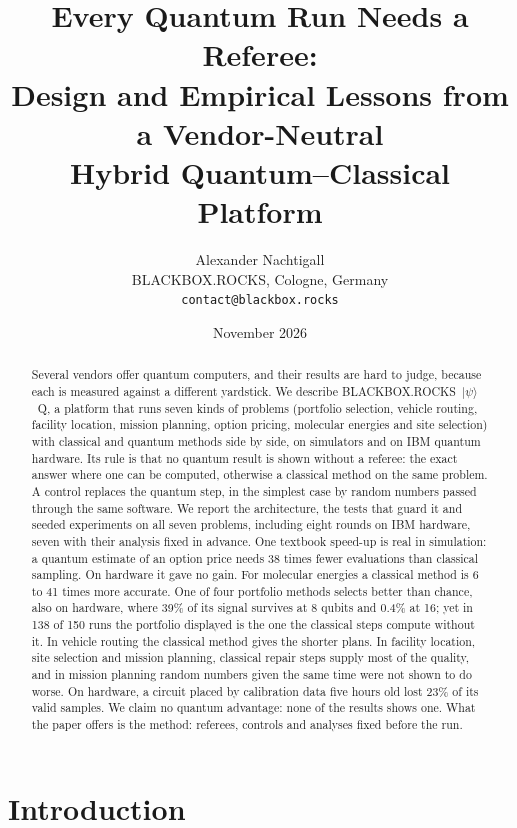 \documentclass[11pt,a4paper]{article}
\title{Every Quantum Run Needs a Referee:\\
Design and Empirical Lessons from a Vendor-Neutral\\ Hybrid Quantum--Classical Platform}
\author{Alexander Nachtigall\\
\small BLACKBOX.ROCKS, Cologne, Germany\\
\small \texttt{contact@blackbox.rocks}}
\date{November 2026}
\newcommand{\sysname}{BLACKBOX.ROCKS~$|\psi\rangle$~Q}
\begin{document}
\maketitle

\begin{abstract}
Several vendors offer quantum computers, and their results are hard to judge,
because each is measured against a different yardstick. We describe
\sysname, a platform that runs seven kinds of problems (portfolio selection,
vehicle routing, facility location, mission planning, option pricing,
molecular energies and site selection) with classical and quantum methods
side by side, on simulators and on IBM quantum hardware. Its rule is that
no quantum result is shown without a referee: the exact answer where one
can be computed, otherwise a classical method on the same problem. A control
replaces the quantum step, in the simplest case by random numbers passed
through the same software. We report the architecture, the tests that guard
it and seeded experiments on all seven problems, including eight rounds on
IBM hardware, seven with their analysis fixed in advance. One textbook
speed-up is real in simulation: a quantum estimate of an option price needs
38 times fewer evaluations than classical sampling. On hardware it gave no
gain. For molecular energies a classical method is 6 to 41 times more
accurate. One of four portfolio methods selects better than chance, also on
hardware, where 39\% of its signal survives at 8 qubits and 0.4\% at 16; yet
in 138 of 150 runs the portfolio displayed is the one the classical steps
compute without it. In vehicle routing the classical method gives the
shorter plans. In facility location, site selection and mission planning,
classical repair steps supply most of the quality, and in mission planning
random numbers given the same time were not shown to do worse. On hardware,
a circuit placed by calibration data five hours old lost 23\% of its valid
samples. We claim no quantum advantage: none of the results shows one. What
the paper offers is the method: referees, controls and analyses fixed before
the run.
\end{abstract}

\clearpage
\tableofcontents

\clearpage
\section{Introduction}
\label{sec:intro}
\end{document}
